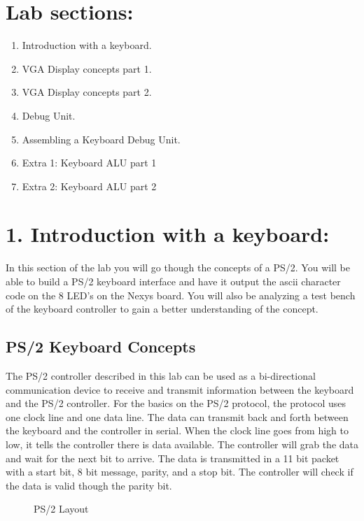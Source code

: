 \documentclass{article}
\begin{document}
\section{Lab sections:}
\begin{enumerate}
  \item Introduction with a keyboard.
  \item VGA Display concepts part 1.
  \item VGA Display concepts part 2.
  \item Debug Unit.
  \item Assembling a Keyboard Debug Unit.
  \item Extra 1: Keyboard ALU part 1
  \item Extra 2: Keyboard ALU part 2
\end{enumerate}

\newpage
\section{1. Introduction with a keyboard:}
In this section of the lab you will go though the concepts of a PS/2. You will be able to build a PS/2 keyboard interface and have it output the ascii character code on the 8 LED's on the Nexys board. You will also be analyzing a test bench of the keyboard controller to gain a better understanding of the concept.

\subsection{PS/2 Keyboard Concepts}
The PS/2 controller described in this lab can be used as a bi-directional communication device to receive and transmit information between the keyboard and the PS/2 controller. For the basics on the PS/2 protocol, the protocol uses one clock line and one data line. The data can transmit back and forth between the keyboard and the controller in serial. When the clock line goes from high to low, it tells the controller there is data available. The controller will grab the data and wait for the next bit to arrive. The data is transmitted in a 11 bit packet with a start bit, 8 bit message, parity, and a stop bit. The controller will check if the data is valid though the parity bit.

\begin{figure}[!htbp]
  \centering
  \caption{PS/2 Layout}
\end{figure}
\end{document}
